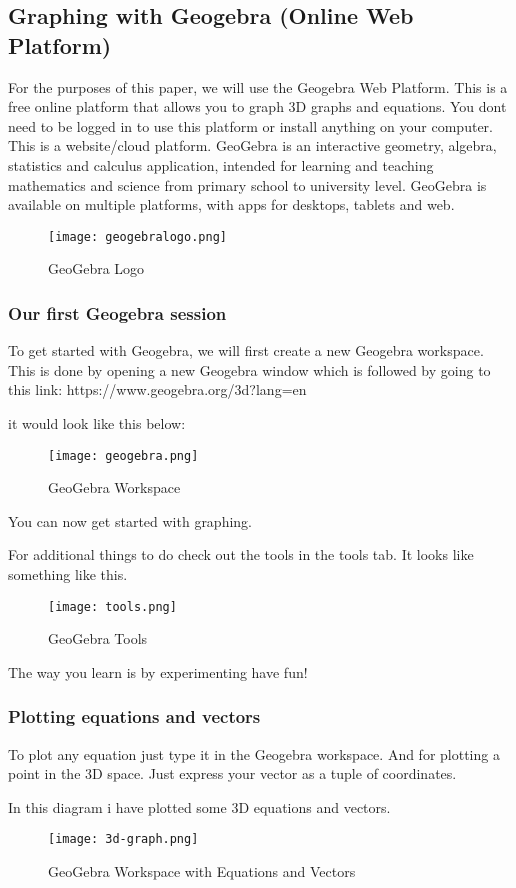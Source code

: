 \newpage

\subsection{Graphing with Geogebra (Online Web Platform)}
For the purposes of this paper, we will use the Geogebra Web Platform. This is a free online platform that allows you to graph 3D graphs and equations. You dont need to be logged in to use this platform or install anything on your computer. This is a website/cloud platform.
GeoGebra is an interactive geometry, algebra, statistics and calculus application, intended for learning and teaching mathematics and science from primary school to university level. GeoGebra is available on multiple platforms, with apps for desktops, tablets and web.

\begin{figure}[htb]
\centering
\texttt{[image: geogebralogo.png]}
\caption{GeoGebra Logo}
\label{fig:geogebra}
\end{figure}



\subsubsection{Our first Geogebra session}

To get started with Geogebra, we will first create a new Geogebra workspace. This is done by opening a new Geogebra window which is followed by going to this link:
https://www.geogebra.org/3d?lang=en

it would look like this below:
\begin{figure}[htb]
\centering
\texttt{[image: geogebra.png]}
\caption{GeoGebra Workspace}
\label{fig:geogebraworkspace}
\end{figure}

You can now get started with graphing.

For additional things to do check out the tools in the tools tab. It looks like something like this.
\begin{figure}[htb]
\centering
\texttt{[image: tools.png]}
\caption{GeoGebra Tools}
\label{fig:geogebratools}
\end{figure}

The way you learn is by experimenting have fun!

\newpage

\subsubsection{Plotting equations and vectors}
To plot any equation just type it in the Geogebra workspace. And for plotting a point in the 3D space. Just express your vector as a tuple of coordinates.

In this diagram i have plotted some 3D equations and vectors.

\begin{figure}[htb]
\centering
\texttt{[image: 3d-graph.png]}
\caption{GeoGebra Workspace with Equations and Vectors}
\label{fig:geogebragraphs}
\end{figure}

